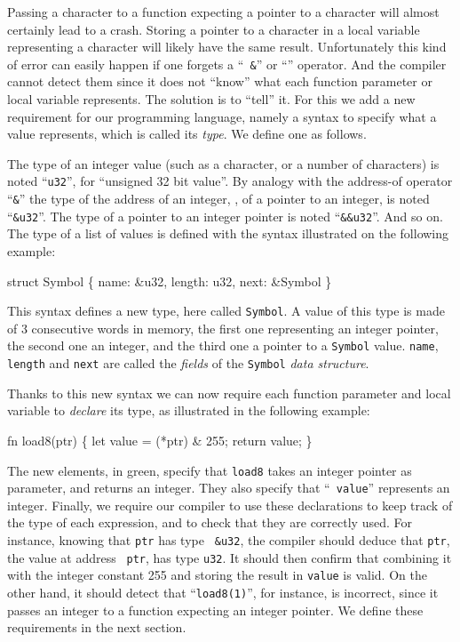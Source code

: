 Passing a character to a function expecting a pointer to a character will
almost certainly lead to a crash. Storing a pointer to a character in a local
variable representing a character will likely have the same result.
Unfortunately this kind of error can easily happen if one forgets a ``{\tt
\&}'' or ``{\tt *}'' operator. And the compiler cannot detect them since it
does not ``know'' what each function parameter or local variable represents.
The solution is to ``tell'' it. For this we add a new requirement for our
programming language, namely a syntax to specify what a value represents, which
is called its {\em type}. We define one as follows.

The type of an integer value (such as a character, or a number of characters)
is noted ``{\tt u32}'', for ``unsigned 32 bit value''. By analogy with the
address-of operator ``{\tt \&}'' the type of the address of an integer, \ie,
of a pointer to an integer, is noted ``{\tt \&u32}''. The type of a pointer to
an integer pointer is noted ``{\tt \&\&u32}''. And so on. The type of a list of
values is defined with the syntax illustrated on the following example:

\begin{Code}
struct Symbol \{
  name: \&u32,
  length: u32,
  next: \&Symbol
\}
\end{Code}

\noindent This syntax defines a new type, here called {\tt Symbol}. A value of
this type is made of 3 consecutive words in memory, the first one representing
an integer pointer, the second one an integer, and the third one a pointer to a
{\tt Symbol} value. {\tt name}, {\tt length} and {\tt next} are called the {\em
fields} of the {\tt Symbol} {\em data structure}.

Thanks to this new syntax we can now require each function parameter and local
variable to {\em declare} its type, as illustrated in the following example:

\begin{Code}
fn load8(ptr) \{ let value = (*ptr) \& 255; return value; \}
\end{Code}

\noindent The new elements, in green, specify that {\tt load8} takes an integer
pointer as parameter, and returns an integer. They also specify that ``{\tt
value}'' represents an integer. Finally, we require our compiler to use these
declarations to keep track of the type of each expression, and to check that
they are correctly used. For instance, knowing that {\tt ptr} has type {\tt
\&u32}, the compiler should deduce that {\tt *ptr}, the value at address {\tt
ptr}, has type {\tt u32}. It should then confirm that combining it with the
integer constant 255 and storing the result in {\tt value} is valid. On the
other hand, it should detect that ``{\tt load8(1)}'', for instance, is
incorrect, since it passes an integer to a function expecting an integer
pointer. We define these requirements in the next section.

